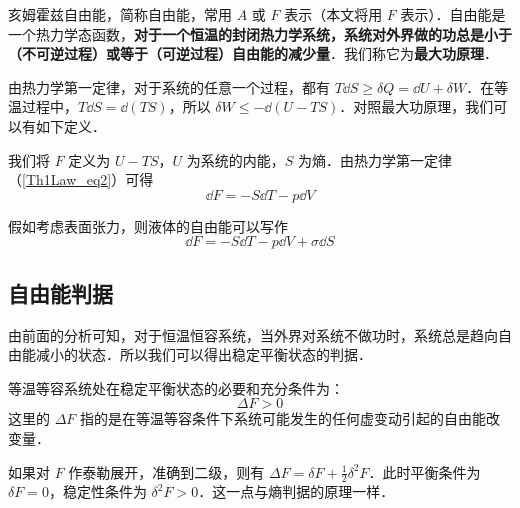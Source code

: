 

亥姆霍兹自由能，简称自由能，常用 $A$ 或 $F$ 表示（本文将用 $F$ 表示）．自由能是一个热力学态函数，\textbf{对于一个恒温的封闭热力学系统，系统对外界做的功总是小于（不可逆过程）或等于（可逆过程）自由能的减少量}．我们称它为\textbf{最大功原理}．

由热力学第一定律，对于系统的任意一个过程，都有 $T\dd S\ge \delta Q=\dd U+\delta W$．在等温过程中，$T\dd S=\dd (TS)$，所以 $\delta W\le - \dd (U-TS)$．对照最大功原理，我们可以有如下定义．

我们将 $F$ 定义为 $U-TS$，$U$ 为系统的内能，$S$ 为熵．由热力学第一定律（\autoref{Th1Law_eq2}）可得
\begin{equation}
\dd F=-S\dd T-p\dd V
\end{equation}

假如考虑表面张力，则液体的自由能可以写作
\begin{equation}
\dd F=-S\dd T-p \dd V+\sigma \dd S
\end{equation}
\subsection{自由能判据}
由前面的分析可知，对于恒温恒容系统，当外界对系统不做功时，系统总是趋向自由能减小的状态．所以我们可以得出稳定平衡状态的判据．

等温等容系统处在稳定平衡状态的必要和充分条件为：
\begin{equation}
\Delta F>0
\end{equation}
这里的 $\Delta F$ 指的是在等温等容条件下系统可能发生的任何虚变动引起的自由能改变量．

如果对 $F$ 作泰勒展开，准确到二级，则有 $\Delta F=\delta F+\frac{1}{2}\delta^2 F$．此时平衡条件为 $\delta F=0$，稳定性条件为 $\delta^2 F>0$．这一点与熵判据的原理一样．
